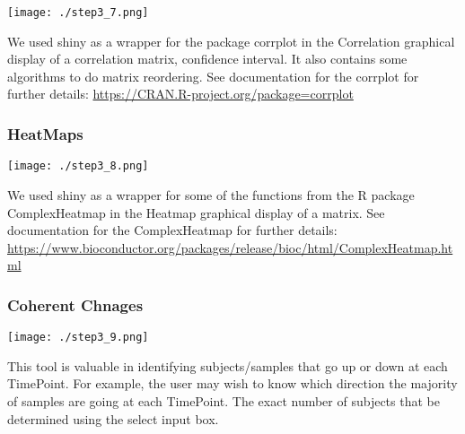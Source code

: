\documentclass[]{article}
\begin{document}
\texttt{[image: ./step3\_7.png]}

We used shiny as a wrapper for the package corrplot in the Correlation
graphical display of a correlation matrix, confidence interval. It also
contains some algorithms to do matrix reordering. See documentation for
the corrplot for further details:
\url{https://CRAN.R-project.org/package=corrplot}

\newpage

\hypertarget{heatmaps}{%
\subsubsection{HeatMaps}\label{heatmaps}}

\texttt{[image: ./step3\_8.png]}

We used shiny as a wrapper for some of the functions from the R package
ComplexHeatmap in the Heatmap graphical display of a matrix. See
documentation for the ComplexHeatmap for further details:
\url{https://www.bioconductor.org/packages/release/bioc/html/ComplexHeatmap.html}

\newpage

\hypertarget{coherent-chnages}{%
\subsubsection{Coherent Chnages}\label{coherent-chnages}}

\texttt{[image: ./step3\_9.png]}

This tool is valuable in identifying subjects/samples that go up or down
at each TimePoint. For example, the user may wish to know which
direction the majority of samples are going at each TimePoint. The exact
number of subjects that be determined using the select input box.
\end{document}
